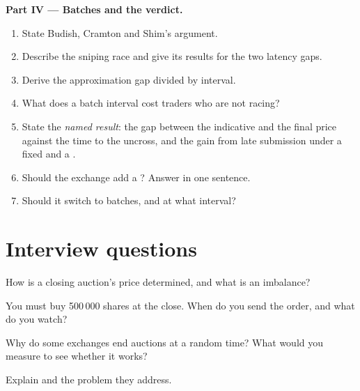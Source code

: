 \begin{problem}
\medskip\noindent\textbf{Part IV --- Batches and the verdict.}
\begin{enumerate}[resume]
\item State Budish, Cramton and Shim's argument.
\item Describe the sniping race and give its results for the two latency gaps.
\item Derive the approximation gap divided by interval.
\item What does a batch interval cost traders who are not racing?
\item State the \emph{named result}: the gap between the indicative and the final price against the time to the uncross, and the gain from late submission
under a fixed and a .
\item Should the exchange add a ? Answer in one sentence.
\item Should it switch to batches, and at what interval?
\end{enumerate}
\end{problem}

\section{Interview questions}

\begin{interviewq}\label{iq:mx:auction-mechanics-and-theory:1}
How is a closing auction's price determined, and what is an imbalance?
\end{interviewq}

\begin{interviewq}\label{iq:mx:auction-mechanics-and-theory:2}
You must buy 500\,000 shares at the close. When do you send the order, and what do you watch?
\end{interviewq}

\begin{interviewq}\label{iq:mx:auction-mechanics-and-theory:3}
Why do some exchanges end auctions at a random time? What would you measure to see whether it works?
\end{interviewq}

\begin{interviewq}\label{iq:mx:auction-mechanics-and-theory:4}
Explain  and the problem they address.
\end{interviewq}

